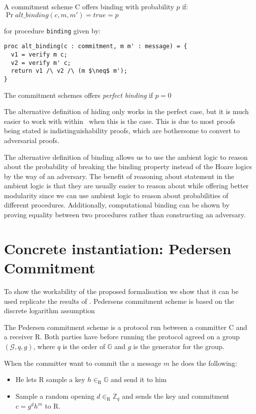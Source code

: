 \begin{definition}
  \label{def:commitment:alt-binding}
  A commitment scheme C offers binding with probability $p$ if:
  $\Pr{alt\_{binding}(c, m, m') = true} = p$

  for procedure \texttt{binding} given by:
\begin{lstlisting}[mathescape]
proc alt_binding(c : commitment, m m' : message) = {
  v1 = verify m c;
  v2 = verify m' c;
  return v1 /\ v2 /\ (m $\neq$ m');
}
\end{lstlisting}

  The commitment schemes offers \textit{perfect binding} if $p = 0$
\end{definition}

The alternative definition of hiding only works in the perfect case, but it is much easier
to work with within \easycrypt\  when this is the case. This is due to most
proofs being stated is indistinguishability proofs, which are bothersome to
convert to adversarial proofs. 

The alternative definition of binding allows us to use the ambient logic to
reason about the probability of breaking the binding property instead of the
Hoare logics by the way of an adversary. The benefit of reasoning about
statement in the ambient logic is that they are usually easier to reason about
while offering better modularity since we can use ambient logic to
reason about probabilities of different procedures.
Additionally, computational binding can be shown by proving equality between two
procedures rather than constructing an adversary.


\section{Concrete instantiation: Pedersen Commitment}
\label{sec:pedersen}

To show the workability of the proposed formalisation we show that it can be
used replicate the results of \citet{DBLP:journals/corr/MetereD17}. Pedersens
commitment scheme is based on the discrete logarithm assumption

The Pedersen commitment scheme is a protocol run between a committer C and a
receiver R. Both parties have before running the protocol agreed on a group
$(\mathcal{G}, q, g)$, where $q$ is the order of $\mathbb{G}$ and $g$ is the
generator for the group.

When the committer want to commit the a message $m$ he does the following:
\begin{itemize}
  \item He lets R sample a key $h \in_{\text{R}} \mathbb{G}$ and send it to him
  \item Sample a random opening $d \in_{\text{R}} \mathbb{Z}_{q}$ and sends the
    key and commitment $c = g^{d}h^{m}$ to R.
\end{itemize}

